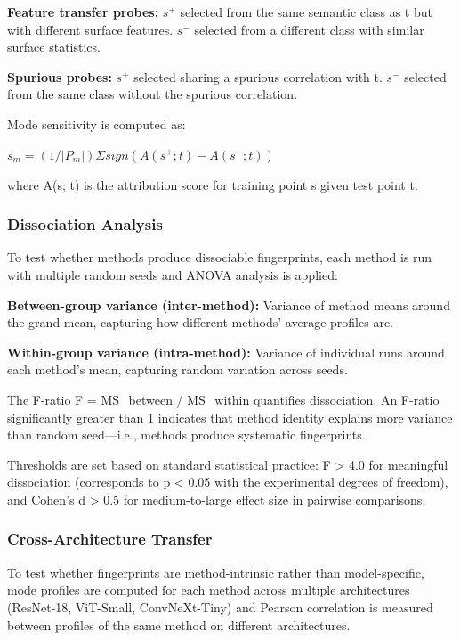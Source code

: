 \textbf{Feature transfer probes:} $s^+$ selected from the same semantic class as t but with different surface features. $s^-$ selected from a different class with similar surface statistics.

\textbf{Spurious probes:} $s^+$ selected sharing a spurious correlation with t. $s^-$ selected from the same class without the spurious correlation.

Mode sensitivity is computed as:

$s_m = (1/|P_m|) \Sigma sign(A(s^+; t) - A(s^-; t))$

where A(s; t) is the attribution score for training point s given test point t.

\subsubsection{Dissociation Analysis}

To test whether methods produce dissociable fingerprints, each method is run with multiple random seeds and ANOVA analysis is applied:

\textbf{Between-group variance (inter-method):} Variance of method means around the grand mean, capturing how different methods' average profiles are.

\textbf{Within-group variance (intra-method):} Variance of individual runs around each method's mean, capturing random variation across seeds.

The F-ratio F = MS\_between / MS\_within quantifies dissociation. An F-ratio significantly greater than 1 indicates that method identity explains more variance than random seed---i.e., methods produce systematic fingerprints.

Thresholds are set based on standard statistical practice: F > 4.0 for meaningful dissociation (corresponds to p < 0.05 with the experimental degrees of freedom), and Cohen's d > 0.5 for medium-to-large effect size in pairwise comparisons.

\subsubsection{Cross-Architecture Transfer}

To test whether fingerprints are method-intrinsic rather than model-specific, mode profiles are computed for each method across multiple architectures (ResNet-18, ViT-Small, ConvNeXt-Tiny) and Pearson correlation is measured between profiles of the same method on different architectures.


